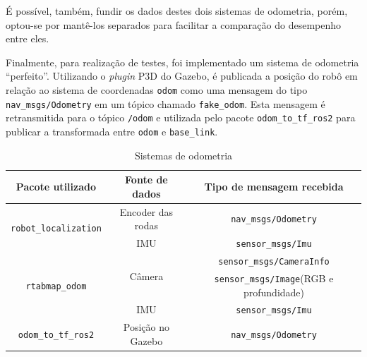 \documentclass[repeatfields,xlists,xpacks,oneside,yearsonly]{ufrgscca}
\begin{document}
É possível, também, fundir os dados destes dois sistemas de odometria,
porém, optou-se por mantê-los separados para facilitar a comparação
do desempenho entre eles.

Finalmente, para realização de testes, foi implementado um sistema de
odometria 
“perfeito”. Utilizando o \textit{plugin} P3D do Gazebo, é publicada a
posição do robô em relação ao sistema de coordenadas \texttt{odom}
como uma mensagem do tipo \texttt{nav\_msgs/Odometry} em um tópico
chamado \texttt{fake\_odom}. Esta mensagem é retransmitida para o
tópico \texttt{/odom} e utilizada pelo pacote
\texttt{odom\_to\_tf\_ros2} para publicar a transformada entre
\texttt{odom} e \texttt{base\_link}.


\begin{table}[h]
    \begin{center}
        \caption{Sistemas de odometria}
        \label{tab:odometria}
        \begin{tabular}{c|c|c}
            Pacote utilizado                              & Fonte de dados          & Tipo de mensagem recebida                       \\
            \hline
            \multirow{2}{*}{\texttt{robot\_localization}} & Encoder das rodas       & \texttt{nav\_msgs/Odometry}                     \\
                                                          & IMU                     & \texttt{sensor\_msgs/Imu}                       \\
            \hline
            \multirow{3}{*}{\texttt{rtabmap\_odom}}       & \multirow{2}{*}{Câmera} & \texttt{sensor\_msgs/CameraInfo}                \\
                                                          &                         & \texttt{sensor\_msgs/Image}(RGB e profundidade) \\
                                                          & IMU                     & \texttt{sensor\_msgs/Imu}                       \\
            \hline
            \texttt{odom\_to\_tf\_ros2}                   & Posição no Gazebo       & \texttt{nav\_msgs/Odometry}                     \\
        \end{tabular}
    \end{center}
\end{table}
\end{document}
